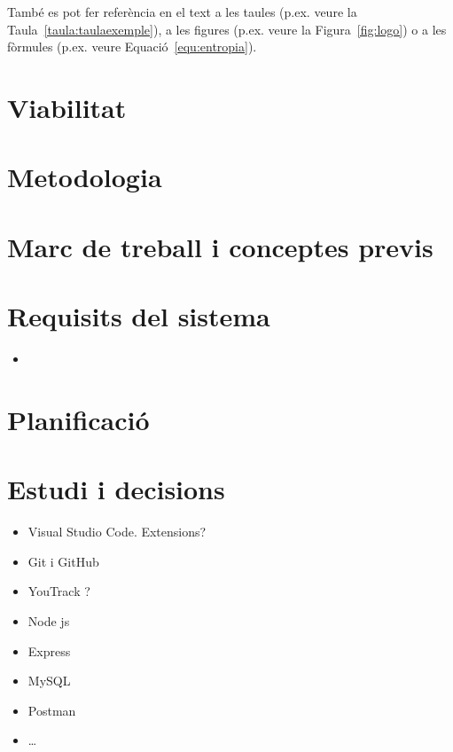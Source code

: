 \documentclass[a4paper,12pt]{ThesisStyle}
\begin{document}
També es pot fer referència en el text a les taules (p.ex. veure la Taula~\ref{taula:taulaexemple}), a les figures (p.ex. veure la Figura~\ref{fig:logo})
o a les fòrmules (p.ex. veure Equació~\ref{equ:entropia}).



\chapter{Viabilitat}
\label{cap:viabilitat}



\chapter{Metodologia}
\label{cap:metodologia}



\chapter{Marc de treball i conceptes previs}
\label{cap:marcdetreball}



\chapter{Requisits del sistema}
\label{cap:requisits}

\begin{itemize}
  \item 
\end{itemize}

\chapter{Planificació}  %
\label{cap:planificacio}



\chapter{Estudi i decisions}
\label{cap:estudi}

\begin{itemize}
  \item Visual Studio Code. Extensions?
  \item Git i GitHub
  \item YouTrack ?
  \item Node js
  \item Express
  \item MySQL
  \item Postman
  \item \ldots
\end{itemize}
\end{document}
